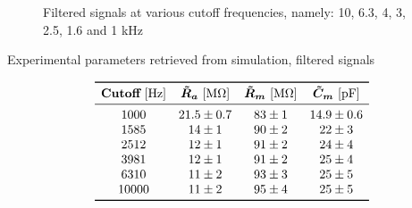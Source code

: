 \documentclass[a4paper]{article}
\begin{document}
\begin{figure}

\caption{Filtered signals at various cutoff frequencies, namely: 10, 6.3, 4, 3, 2.5, 1.6 and 1 kHz}
\label{fig:current_filtered}
\end{figure}


\begin{table}[h]
\caption{Experimental parameters retrieved from simulation, filtered signals}
\label{tab:parameters_filtered}
\vspace{-.4cm}
\centering
\[
\begin{array}{cccc}
\toprule
\textbf{Cutoff}\ [\si{\hertz}]&\bm{\tilde{R}_a}\ [\si{\mega \ohm}]&\bm{\tilde{R}_m}\ [\si{\mega\ohm}]& \bm{\tilde{C}_m}\ [\si{\pico\farad}]\\
\midrule
1000    &   21.5    \pm 0.7 &   83  \pm 1   &   14.9    \pm 0.6 \\
1585    &   14  \pm 1   &   90  \pm 2   &   22  \pm 3   \\
2512    &   12  \pm 1   &   91  \pm 2   &   24  \pm 4   \\
3981    &   12  \pm 1   &   91  \pm 2   &   25  \pm 4   \\
6310    &   11  \pm 2   &   93  \pm 3   &   25  \pm 5   \\
10000   &   11  \pm 2   &   95  \pm 4   &   25  \pm 5   \\
\bottomrule
\end{array}
\]
\end{table}
\end{document}
